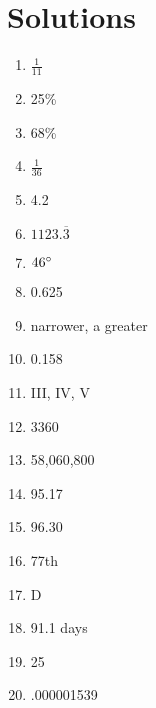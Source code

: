 \documentclass[../uilmath.tex]{subfiles}
\begin{document}
\section*{Solutions}
\begin{enumerate}[label=\bfseries\arabic*.]
    \item %
    $\frac{1}{11}$

    \item %
    25\%

    \item %
    68\% 

    \item %
    $\frac{1}{36}$

    \item %
    4.2

    \item %
    $1123.\overline{3}$

    \item %
    $46\degree$

    \item %
    0.625

    \item %
    narrower, a greater 

    \item %
    0.158

    \item %
    III, IV, V 

    \item %
    3360

    \item %
    58,060,800

    \item %
    95.17

    \item %
    96.30

    \item %
    77th

    \item %
    D 

    \item %
    91.1 days 

    \item %
    25

    \item %
    .000001539


\end{enumerate}
\end{document}
